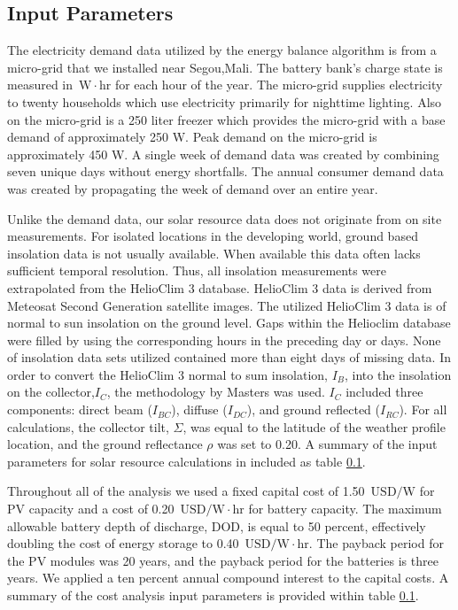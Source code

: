 \documentclass{article}
\newcommand{\unit}[1]{\ensuremath{\, \mathrm{#1}}}
\begin{document}
\subsection{Input Parameters}
%
The electricity demand data utilized by the energy balance algorithm is from a micro-grid that we installed near Segou,Mali. 
The battery bank's charge state is measured in {\unit{W\!\cdot \! hr}} for each hour of the year.
The micro-grid supplies electricity to twenty households which use electricity primarily for nighttime lighting.
Also on the micro-grid is a 250 liter freezer which provides the micro-grid with a base demand of approximately 250 W. 
Peak demand on the micro-grid is approximately 450 W. 
A single week of demand data was created by combining seven unique days without energy shortfalls. 
The annual consumer demand data was created by propagating the week of demand over an entire year.

% 
Unlike the demand data, our solar resource data does not originate from on site measurements.
For isolated locations in the developing world, ground based insolation data is not usually available. 
When available this data often lacks sufficient temporal resolution. 
Thus, all insolation measurements were extrapolated from the HelioClim 3 database.
HelioClim 3 data is derived from Meteosat Second Generation satellite images.
The utilized HelioClim 3 data is of normal to sun insolation on the ground level.
Gaps within the Helioclim database were filled by using the corresponding hours in the preceding day or days.
None of insolation data sets utilized contained more than eight days of missing data.
In order to convert the HelioClim 3 normal to sum insolation, $I_B$, into the insolation on the collector,$I_C$, the methodology by Masters \cite{} was used. 
$I_C$ included three components: direct beam ($I_{BC}$), diffuse ($I_{DC}$), and ground reflected ($I_{RC}$).
For all calculations, the collector tilt, $\Sigma$, was equal to the latitude of the weather profile location, and the ground reflectance $\rho$ was set to 0.20.
A summary of the input parameters for solar resource calculations in included as table \ref{}.

Throughout all of the analysis we used a fixed capital cost of 1.50 \unit{USD/W} for PV capacity and a cost of 0.20 \unit{USD/W \! \cdot \! hr} for battery capacity.
The maximum allowable battery depth of discharge, DOD, is equal to 50 percent, effectively doubling the cost of energy storage to 0.40 \unit{USD/W \! \cdot \! hr}. 
The payback period for the PV modules was 20 years, and the payback period for the batteries is three years. 
We applied a ten percent annual compound interest to the capital costs. 
A summary of the cost analysis input parameters is provided within table \ref{}.
\end{document}
